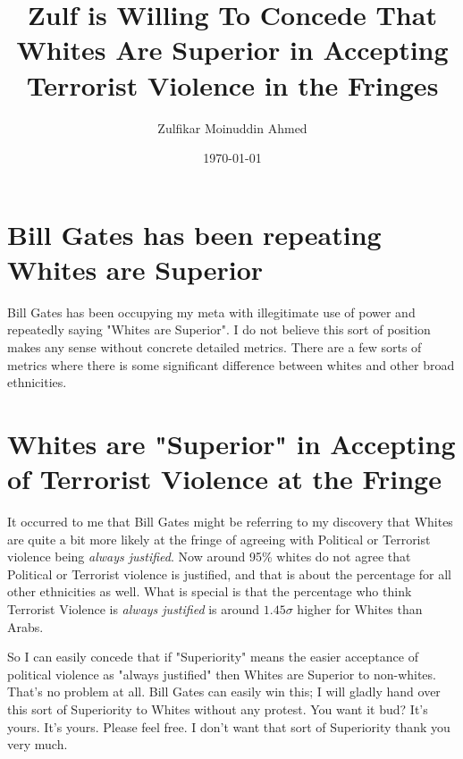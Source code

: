 \documentclass{amsart}
\title{Zulf is Willing To Concede That Whites Are Superior in Accepting Terrorist Violence in the Fringes}
\author{Zulfikar Moinuddin Ahmed}
\date{\today}
\begin{document}
\maketitle

\section{Bill Gates has been repeating Whites are Superior}

Bill Gates has been occupying my meta with illegitimate use of power and repeatedly saying "Whites are Superior".  I do not believe this sort of position makes any sense without concrete detailed metrics.  There are a few sorts of metrics where there is some significant difference between whites and other broad ethnicities.

\section{Whites are  "Superior" in Accepting of Terrorist Violence at the Fringe}

It occurred to me that Bill Gates might be referring to my discovery that Whites are quite a bit more likely at the fringe of agreeing with Political or Terrorist violence being {\em always justified}.  Now around 95\% whites do not agree that Political or Terrorist violence is justified, and that is about the percentage for all other ethnicities as well.  What is special is that the percentage who think Terrorist Violence is {\em always justified} is around $1.45\sigma$ higher for Whites than Arabs.  

So I can easily concede that if "Superiority" means the easier acceptance of political violence as "always justified" then Whites are Superior to non-whites. That's no problem at all.  Bill Gates can easily win this; I will gladly hand over this sort of Superiority to Whites without any protest.  You want it bud?  It's yours.  It's yours.  Please feel free.  I don't want that sort of Superiority thank you very much.
\end{document}
